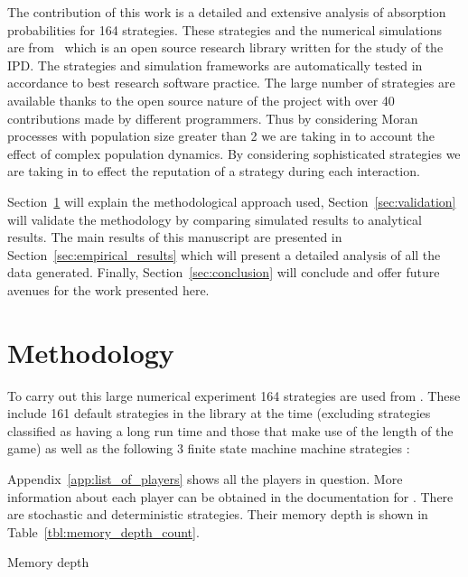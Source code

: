 \documentclass{article}
\begin{document}
The contribution of this work is a detailed and extensive analysis of absorption
probabilities for 164 strategies. These strategies and the numerical simulations
are from~\cite{axelrodproject} which is an open source research library written
for the study of the IPD\@. The strategies and simulation frameworks are
automatically tested in accordance to best research software practice. The large
number of strategies are available thanks to the open source nature of the
project with over 40 contributions made by different programmers. Thus by
considering Moran processes with population size greater than 2 we are taking in
to account the effect of complex population dynamics. By considering
sophisticated strategies we are taking in to effect the reputation of a strategy
during each interaction.

Section~\ref{sec:methodology} will explain the methodological approach used,
Section~\ref{sec:validation} will validate the methodology by comparing
simulated results to analytical results. The main results of this manuscript are
presented in Section~\ref{sec:empirical_results} which will present a detailed
analysis of all the data generated. Finally, Section~\ref{sec:conclusion} will
conclude and offer future avenues for the work presented here.

\section{Methodology}\label{sec:methodology}

To carry out this large numerical experiment 164 strategies are used from
\cite{axelrodproject}. These include 161 default strategies in the library at
the time (excluding strategies classified as having a long run time and those
that make use of the length of the game) as well as
the following 3 finite state machine machine strategies \cite{Ashlock2006}:


Appendix~\ref{app:list_of_players} shows all the players in question. More
information about each player can be obtained in the documentation for
\cite{axelrodproject}. There are stochastic and
deterministic strategies. Their memory
depth is shown in Table~\ref{tbl:memory_depth_count}.

\begin{table}[!hbtp]
    \centering
        
        \caption{Memory depth}
        \label{tbl:memory_depth_count}
\end{table}
\end{document}
